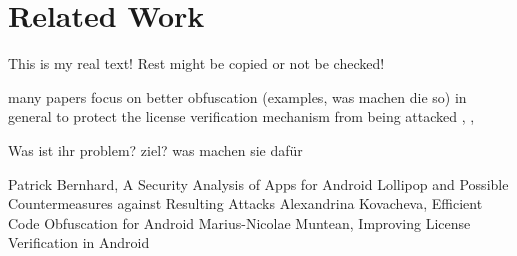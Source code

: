 \section{Related Work}\label{section:introduction-related}
This is my real text! Rest might be copied or not be checked!

many papers focus on better obfuscation (examples, was machen die so) in general to protect the license verification mechanism from being attacked \cite{bernhardSecurity}, \cite{kovachevaMaster}, \cite{munteanLicense}

Was ist ihr problem? ziel? was machen sie dafür

Patrick Bernhard, A Security Analysis of Apps for Android Lollipop and Possible Countermeasures against Resulting Attacks
Alexandrina Kovacheva, Efficient Code Obfuscation for Android \cite{kovachevaMaster}
Marius-Nicolae Muntean, Improving License Verification in Android
